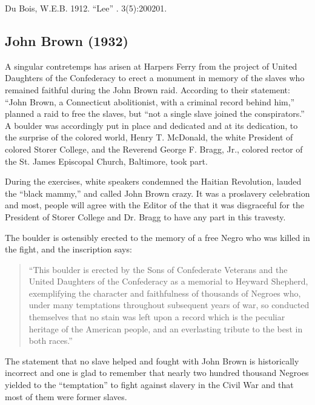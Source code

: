 \documentclass[letterpaper,10pt,english]{jupyterBook}
\begin{document}
\sphinxAtStartPar
{} Du Bois, W.E.B. 1912. “Lee” . 3(5):200\sphinxhyphen{}201.


\subsection{John Brown (1932)}
\label{\detokenize{Volumes/39/01/john_brown:john-brown-1932}}\label{\detokenize{Volumes/39/01/john_brown::doc}}
\sphinxAtStartPar
A singular contretemps has arisen at Harpers Ferry from the project of United Daughters of the Confederacy to erect a monument in memory of the slaves who remained faithful during the John Brown raid. According to their statement: “John Brown, a Connecticut abolitionist, with a criminal record behind him,” planned a raid to free the slaves, but “not a single slave joined the conspirators.” A boulder was accordingly put in place and dedicated and at its dedication, to the surprise of the colored world, Henry T. McDonald, the white President of colored Storer College, and the Reverend George F. Bragg, Jr., colored rector of the St. James Episcopal Church, Baltimore, took part.

\sphinxAtStartPar
During the exercises, white speakers condemned the Haitian Revolution, lauded the “black mammy,” and called John Brown crazy. It was a pro\sphinxhyphen{}slavery celebration and most, people will agree with the Editor of the  that it was disgraceful for the President of Storer College and Dr. Bragg to have any part in this travesty.

\sphinxAtStartPar
The boulder is ostensibly erected to the memory of a free Negro who was killed in the fight, and the inscription says:
\begin{quote}

\sphinxAtStartPar
“This boulder is erected by the Sons of Confederate Veterans and the United Daughters of the Confederacy as a memorial to Heyward Shepherd, exemplifying the character and faithfulness of thousands of Negroes who, under many temptations throughout subsequent years of war, so conducted themselves that no stain was left upon a record which is the peculiar heritage of the American people, and an everlasting tribute to the best in both races.”
\end{quote}

\sphinxAtStartPar
The statement that no slave helped and fought with John Brown is historically incorrect and one is glad to remember that nearly two hundred thousand Negroes yielded to the “temptation” to fight against slavery in the Civil War and that most of them were former slaves.
\end{document}
